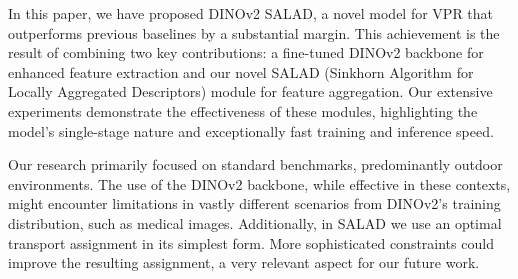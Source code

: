 \documentclass[10pt,twocolumn,letterpaper]{article}
\begin{document}
In this paper, we have proposed DINOv2 SALAD, a novel model for VPR that outperforms previous baselines by a substantial margin. This achievement is the result of combining two key contributions: a fine-tuned DINOv2 backbone for enhanced feature extraction and our novel SALAD (Sinkhorn Algorithm for Locally Aggregated Descriptors) module for feature aggregation. Our extensive experiments demonstrate the effectiveness of these modules, highlighting the model's single-stage nature and exceptionally fast training and inference speed.

Our research primarily focused on standard benchmarks, predominantly outdoor environments. The use of the DINOv2 backbone, while effective in these contexts, might encounter limitations in vastly different scenarios from DINOv2's training distribution, such as medical images. Additionally, in SALAD we use an optimal transport assignment in its simplest form. More sophisticated constraints could improve the resulting assignment, a very relevant aspect for our future work.
 
\newpage

{
    \small
    
    
}
\end{document}
